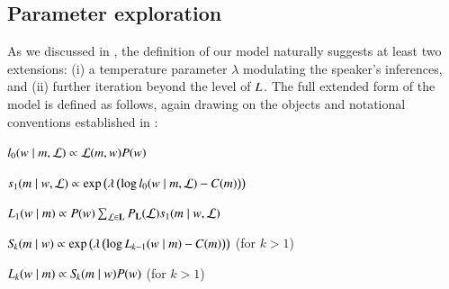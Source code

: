 \documentclass[leqno,12pt]{article}
\begin{document}
\begin{appendix}

\section{Parameter exploration}\label{app:paramexplore}

As we discussed in , the definition of our model
naturally suggests at least two extensions: (i) a temperature
parameter $\lambda$ modulating the speaker's inferences, and (ii)
further iteration beyond the level of $\UncertaintyListener$. The full
extended form of the model is defined as follows, again drawing on the
objects and notational conventions established in :
%
\begin{examples}
\item\label{agents-extended}
  \begin{examples}
  \item
    $\listenerZero(\state \given \msg, \Lex) \propto \Lex(\msg, \state)\StatePrior(\state)$

  \item 
    $\speakerOne(\msg \given \state, \Lex) \propto
    \exp
    \left(\lambda \left(
      \log\listenerZero(\state \given \msg, \Lex)
      - 
      \Costs(\msg)\right)
    \right)$
    
  \item
    $\UncertaintyListener[1](\state \given \msg) 
    \propto 
    \StatePrior(\state)
    \sum_{\Lex \in \LexSet}
    \LexPrior(\Lex)
    \speakerOne(\msg \given \state, \Lex)$

  \item $\UncertaintySpeaker{k}(\msg \given \state) \propto
    \exp
    \left(\lambda \left(
      \log\UncertaintyListener[k-1](\state \given \msg)
      - 
      \Costs(\msg)
    \right)\right)$
  \hfill (for $k > 1$)

  \item $\UncertaintyListener[k](\state \given \msg) \propto 
    \UncertaintySpeaker{k}(\msg \given \state) \StatePrior(\state)$
    \hfill (for $k > 1$)
  \end{examples}
\end{examples}


\end{appendix}
\end{document}
